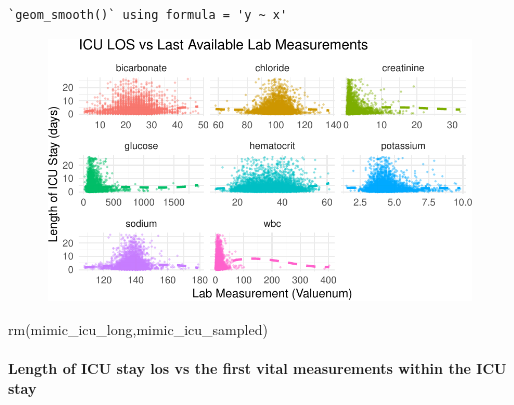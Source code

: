 \documentclass[
]{article}
\let\oldparagraph\paragraph
\renewcommand{\paragraph}[1]{\oldparagraph{#1}\mbox{}}
\newenvironment{Shaded}{\begin{snugshade}}{\end{snugshade}}
\newcommand{\FunctionTok}[1]{\textcolor[rgb]{0.00,0.00,0.00}{#1}}
\newcommand{\NormalTok}[1]{\textcolor[rgb]{0.00,0.00,0.00}{#1}}
\begin{document}
\begin{verbatim}
`geom_smooth()` using formula = 'y ~ x'
\end{verbatim}

\begin{figure}[H]

{\centering \includegraphics{hw3_files/figure-pdf/unnamed-chunk-41-1.pdf}

}

\end{figure}

\begin{Shaded}
\begin{Highlighting}[]
\FunctionTok{rm}\NormalTok{(mimic\_icu\_long,mimic\_icu\_sampled)}
\end{Highlighting}
\end{Shaded}

\hypertarget{length-of-icu-stay-los-vs-the-first-vital-measurements-within-the-icu-stay}{%
\paragraph{Length of ICU stay los vs the first vital measurements within
the ICU
stay}\label{length-of-icu-stay-los-vs-the-first-vital-measurements-within-the-icu-stay}}
\end{document}
